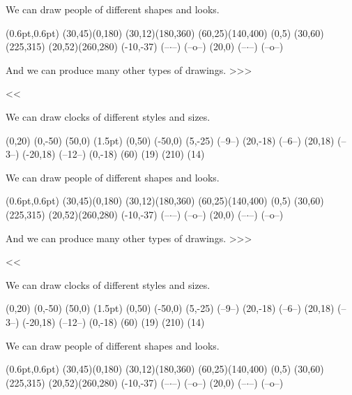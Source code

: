 {We can draw people of 
different shapes and looks.

\Draw(0.6pt,0.6pt)
  \DrawOvalArc(30,45)(0,180) 
  \DrawOvalArc(30,12)(180,360) 
  \DrawOvalArc(60,25)(140,400)
  \Move(0,5)
  \DrawOvalArc(30,60)(225,315)
  \DrawOvalArc(20,52)(260,280)
  \Move(-10,-37) {\Text(--$\cdotp$--)}  \Text(--o--)
  \Move(20,0)    {\Text(--$\cdotp$--)}  \Text(--o--)
\EndDraw

And we can produce many other
types of drawings.       \bye>>>




\<<<
 


We can draw clocks of
different styles and sizes.

\Draw 
  \Move(0,20)     \Line(0,-50) \Line(50,0)
  \PenSize(1.5pt) \Line(0,50)  \Line(-50,0)
  \Move(5,-25)    \Text(--9--)
  \Move(20,-18)   \Text(--6--)
  \Move(20,18)    \Text(--3--)
  \Move(-20,18)   \Text(--12--)
  \Move(0,-18)    {\RotateTo(60) \LineF(19)}
  \RotateTo(210)  \LineF(14)
\EndDraw

We can draw people of 
different shapes and looks.

\Draw(0.6pt,0.6pt)
  \DrawOvalArc(30,45)(0,180) 
  \DrawOvalArc(30,12)(180,360) 
  \DrawOvalArc(60,25)(140,400)
  \Move(0,5)
  \DrawOvalArc(30,60)(225,315)
  \DrawOvalArc(20,52)(260,280)
  \Move(-10,-37) {\Text(--$\cdotp$--)}  \Text(--o--)
  \Move(20,0)    {\Text(--$\cdotp$--)}  \Text(--o--)
\EndDraw

And we can produce many other
types of drawings.       >>>


\<<<


We can draw clocks of
different styles and sizes.

\Draw 
  \Move(0,20)     \Line(0,-50) \Line(50,0)
  \PenSize(1.5pt) \Line(0,50)  \Line(-50,0)
  \Move(5,-25)    \Text(--9--)
  \Move(20,-18)   \Text(--6--)
  \Move(20,18)    \Text(--3--)
  \Move(-20,18)   \Text(--12--)
  \Move(0,-18)    {\RotateTo(60) \LineF(19)}
  \RotateTo(210)  \LineF(14)
\EndDraw

We can draw people of 
different shapes and looks.

\Draw(0.6pt,0.6pt)
  \DrawOvalArc(30,45)(0,180) 
  \DrawOvalArc(30,12)(180,360) 
  \DrawOvalArc(60,25)(140,400)
  \Move(0,5)
  \DrawOvalArc(30,60)(225,315)
  \DrawOvalArc(20,52)(260,280)
  \Move(-10,-37) {\Text(--$\cdotp$--)}  \Text(--o--)
  \Move(20,0)    {\Text(--$\cdotp$--)}  \Text(--o--)
\EndDraw

}
